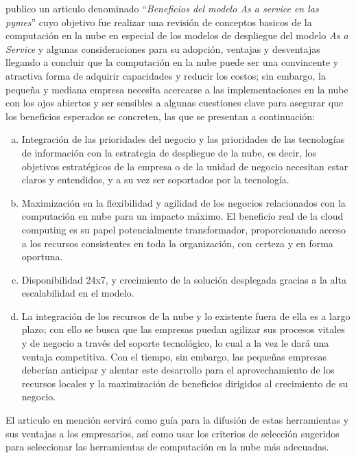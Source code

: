 \cite{jrodriguez} publico un articulo denominado ``\emph{Beneficios del modelo As a
service en las pymes}'' cuyo objetivo fue realizar una revisi\'on de conceptos
basicos de la computaci\'on en la nube en especial de los modelos de despliegue
del modelo \emph{As a Service} y algunas consideraciones para su adopci\'on, ventajas
y desventajas llegando a concluir que la computaci\'on en la nube puede ser una
convincente y atractiva forma de adquirir capacidades y reducir los costos; sin
embargo, la peque\~na y mediana empresa necesita acercarse a las implementaciones
en la nube con los ojos abiertos y ser sensibles a algunas cuestiones clave para
asegurar que los beneficios esperados se concreten, las que se presentan a
continuaci\'on:
\begin{enumerate}[a.]
    \item Integraci\'on de las prioridades del negocio y las prioridades de las
          tecnolog\'ias de informaci\'on con la estrategia de despliegue de la
          nube, es decir, los objetivos estrat\'egicos de la empresa o de la
          unidad de negocio necesitan estar claros y entendidos, y a su vez ser
          soportados por la tecnolog\'ia.
    \item Maximizaci\'on en la flexibilidad y agilidad de los negocios
          relacionados con la computaci\'on en nube para un impacto m\'aximo.
          El beneficio real de la cloud computing es su papel potencialmente
          transformador, proporcionando acceso a los recursos consistentes en
          toda la organizaci\'on, con certeza y en forma oportuna.
    \item Disponibilidad 24x7, y crecimiento de la soluci\'on desplegada gracias
          a la alta escalabilidad en el modelo.
    \item La integraci\'on de los recursos de la nube y lo existente fuera de
          ella es a largo plazo; con ello se busca que las empresas puedan agilizar
          sus procesos vitales y de negocio a trav\'es del soporte tecnol\'ogico,
          lo cual a la vez le dar\'a una ventaja competitiva. Con el tiempo, sin
          embargo, las peque\~nas empresas deber\'ian anticipar y alentar este
          desarrollo para el aprovechamiento de los recursos locales y la maximizaci\'on
          de beneficios dirigidos al crecimiento de su negocio.
\end{enumerate}

El articulo en menci\'on servir\'a como gu\'ia para la difusi\'on de estas herramientas
y sus ventajas a los empresarios, as\'i como usar los criterios de selecci\'on
sugeridos para seleccionar las herramientas de computaci\'on en la nube m\'as
adecuadas.

